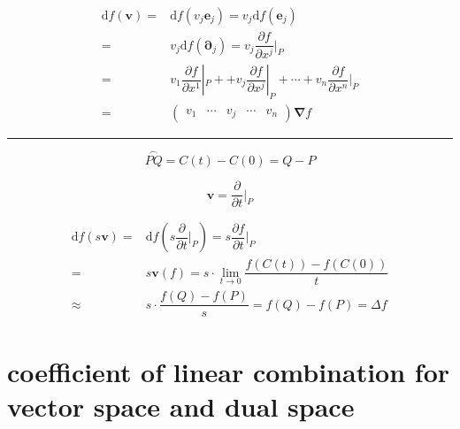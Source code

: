 \documentclass[
]{book}
\theoremstyle{definition}
\theoremstyle{definition}
\theoremstyle{definition}
\theoremstyle{definition}
\theoremstyle{remark}
\begin{document}
\[
\begin{aligned}
\mathrm{d}f\left(\boldsymbol{v}\right)= & \mathrm{d}f\left(v_{{\scriptscriptstyle j}}\boldsymbol{e}_{{\scriptscriptstyle j}}\right)=v_{{\scriptscriptstyle j}}\mathrm{d}f\left(\boldsymbol{e}_{{\scriptscriptstyle j}}\right)\\
= & v_{{\scriptscriptstyle j}}\mathrm{d}f\left(\boldsymbol{\partial}_{{\scriptscriptstyle j}}\right)=v_{{\scriptscriptstyle j}}\dfrac{\partial f}{\partial x^{{\scriptscriptstyle j}}}|_{{\scriptscriptstyle P}}\\
= & v_{{\scriptscriptstyle 1}}\dfrac{\partial f}{\partial x^{{\scriptscriptstyle 1}}}|_{{\scriptscriptstyle P}}++v_{{\scriptscriptstyle j}}\dfrac{\partial f}{\partial x^{{\scriptscriptstyle j}}}|_{{\scriptscriptstyle P}}+\cdots+v_{{\scriptscriptstyle n}}\dfrac{\partial f}{\partial x^{{\scriptscriptstyle n}}}|_{{\scriptscriptstyle P}}\\
= & \begin{pmatrix}v_{{\scriptscriptstyle 1}} & \cdots & v_{{\scriptscriptstyle j}} & \cdots & v_{{\scriptscriptstyle n}}\end{pmatrix}\boldsymbol{\nabla}f
\end{aligned}
\]

\begin{center}\rule{0.5\linewidth}{0.5pt}\end{center}

\[
\overset{\frown}{PQ}=C\left(t\right)-C\left(0\right)=Q-P
\]

\[
\boldsymbol{v}=\dfrac{\partial}{\partial t}|_{{\scriptscriptstyle P}}
\]

\[
\begin{aligned}
\mathrm{d}f\left(s\boldsymbol{v}\right)= & \mathrm{d}f\left(s\dfrac{\partial}{\partial t}|_{{\scriptscriptstyle P}}\right)=s\dfrac{\partial f}{\partial t}|_{{\scriptscriptstyle P}}\\
= & s\boldsymbol{v}\left(f\right)=s\cdot\lim_{t\rightarrow0}\dfrac{f\left(C\left(t\right)\right)-f\left(C\left(0\right)\right)}{t}\\
\approx & s\cdot\dfrac{f\left(Q\right)-f\left(P\right)}{s}=f\left(Q\right)-f\left(P\right)=\Delta f
\end{aligned}
\]

\hypertarget{coefficient-of-linear-combination-for-vector-space-and-dual-space}{%
\section{coefficient of linear combination for vector space and dual space}\label{coefficient-of-linear-combination-for-vector-space-and-dual-space}}
\end{document}
